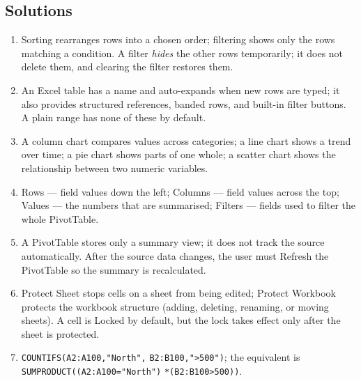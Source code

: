 \documentclass[11pt]{article}
\begin{document}
\subsection*{Solutions}
\begingroup\small
\begin{enumerate}[label=\arabic*.]
  \item Sorting rearranges rows into a chosen order; filtering shows only the
    rows matching a condition. A filter \emph{hides} the other rows temporarily;
    it does not delete them, and clearing the filter restores them.
  \item An Excel table has a name and auto-expands when new rows are typed; it
    also provides structured references, banded rows, and built-in filter
    buttons. A plain range has none of these by default.
  \item A column chart compares values across categories; a line chart shows a
    trend over time; a pie chart shows parts of one whole; a scatter chart shows
    the relationship between two numeric variables.
  \item Rows --- field values down the left; Columns --- field values across the
    top; Values --- the numbers that are summarised; Filters --- fields used to
    filter the whole PivotTable.
  \item A PivotTable stores only a summary view; it does not track the source
    automatically. After the source data changes, the user must Refresh the
    PivotTable so the summary is recalculated.
  \item Protect Sheet stops cells on a sheet from being edited; Protect Workbook
    protects the workbook structure (adding, deleting, renaming, or moving
    sheets). A cell is Locked by default, but the lock takes effect only after
    the sheet is protected.
  \item \texttt{COUNTIFS(A2:A100,"North",} \texttt{B2:B100,">500")}; the
    equivalent is \texttt{SUMPRODUCT((A2:A100="North")}
    \texttt{*(B2:B100>500))}.
\end{enumerate}
\endgroup
\end{document}
